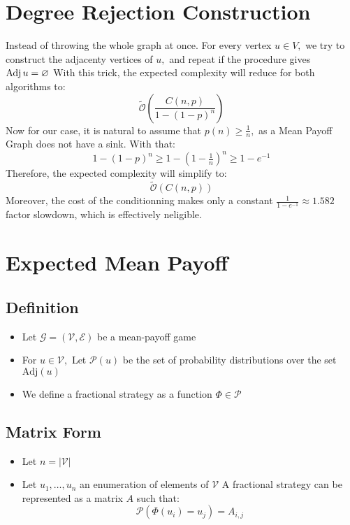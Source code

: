 \section{Degree Rejection Construction}
Instead of throwing the whole graph at once. For every vertex $u\in V,$ we try to construct the adjacenty vertices of $u,$ and repeat if the procedure gives $\operatorname{Adj} u =\varnothing$
\newline With this trick, the expected complexity will reduce for both algorithms to:
$$
\tilde{\mathcal{O}}\left(\frac{C(n,p)}{1-(1-p)^n}\right)
$$
Now for our case, it is natural to assume that $p(n) \ge \frac{1}{n},$ as a Mean Payoff Graph does not have a sink. With that: 
$$
1-(1-p)^n \ge 1-(1-\tfrac{1}{n})^n \ge 1-e^{-1}
$$
Therefore, the expected complexity will simplify to:
$$
\tilde{\mathcal{O}}\left(C(n,p)\right)
$$
Moreover, the cost of the conditionning makes only a constant $\frac{1}{1-e^{-1}}\approx 1.582$ factor slowdown, which is effectively neligible.

\section{Expected Mean Payoff}
\subsection{Definition}
\begin{itemize}
	\item Let $\mathcal{G}=(\mathcal{V},\mathcal{E})$ be a mean-payoff game
	\item For $u\in\mathcal{V},$ Let $\mathscr{P}(u)$ be the set of probability distributions over the set $\text{Adj}(u)$
	\item We define a fractional strategy as a function $\Phi\in \mathscr{P}$

\end{itemize}


\subsection{Matrix Form}
\begin{itemize}
	\item Let $n=\lvert \mathcal{V}\rvert$
	\item Let $u_1,\dots,u_n$ an enumeration of elements of $\mathcal{V}$
	A fractional strategy can be represented as a matrix $A$ such that:
	$$
	\mathcal{P}(\Phi(u_i)=u_j)=A_{i,j}
	$$
\end{itemize}

